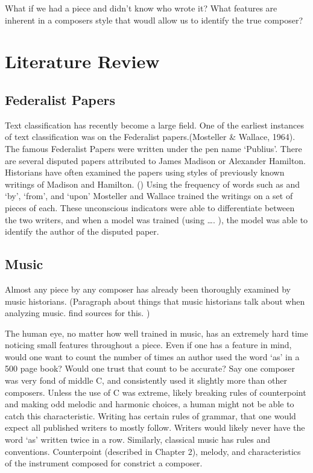 \documentclass[12pt,twoside]{reedthesis}
\theoremstyle{definition}
\theoremstyle{definition}
\theoremstyle{definition}
\theoremstyle{remark}
\begin{document}
What if we had a piece and didn't know who wrote it? What features are
inherent in a composers style that woudl allow us to identify the true
composer?

\section{Literature Review}\label{literature-review}

\subsection{Federalist Papers}\label{federalist-papers}

Text classification has recently become a large field. One of the
earliest instances of text classification was on the Federalist
papers.(Mosteller \& Wallace, 1964). The famous Federalist Papers were
written under the pen name `Publius'. There are several disputed papers
attributed to James Madison or Alexander Hamilton. Historians have often
examined the papers using styles of previously known writings of Madison
and Hamilton. () Using the frequency of words such as and `by', `from',
and `upon' Mosteller and Wallace trained the writings on a set of pieces
of each. These unconscious indicators were able to differentiate between
the two writers, and when a model was trained (using \ldots{}. ), the
model was able to identify the author of the disputed paper.

\subsection{Music}\label{music}

Almost any piece by any composer has already been thoroughly examined by
music historians. (Paragraph about things that music historians talk
about when analyzing music. find sources for this. )

The human eye, no matter how well trained in music, has an extremely
hard time noticing small features throughout a piece. Even if one has a
feature in mind, would one want to count the number of times an author
used the word `as' in a 500 page book? Would one trust that count to be
accurate? Say one composer was very fond of middle C, and consistently
used it slightly more than other composers. Unless the use of C was
extreme, likely breaking rules of counterpoint and making odd melodic
and harmonic choices, a human might not be able to catch this
characteristic. Writing has certain rules of grammar, that one would
expect all published writers to mostly follow. Writers would likely
never have the word `as' written twice in a row. Similarly, classical
music has rules and conventions. Counterpoint (described in Chapter 2),
melody, and characteristics of the instrument composed for constrict a
composer.
\end{document}
